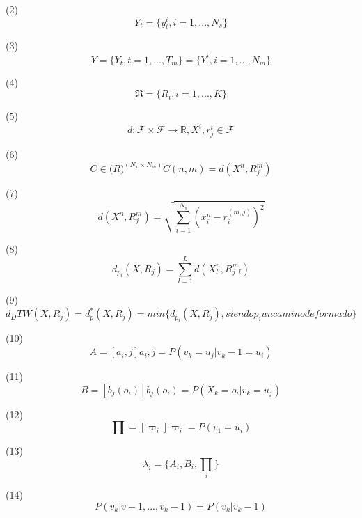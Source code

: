 (2)
\begin{equation}
  Y_t = \{y_t^i, i = 1, ..., N_s\}
\end{equation}

(3)
\begin{equation}
  Y = \{Y_t, t = 1, ..., T_m\} = \{Y^i, i = 1, ..., N_m\}
\end{equation}

(4)
\begin{equation}
  \Re = \{R_i, i = 1, ..., K\}
\end{equation}


(5)
\begin{equation}
  d: \mathcal{F} \times \mathcal{F} \rightarrow \mathbb{R},    X^i , r_j^i \in \mathcal{F}
\end{equation}

(6)
\begin{equation}
  C \in \mathbb(R)^(N_x \times N_m)  C(n,m) = d(X^n, R_j^m)
\end{equation}

(7)
\begin{equation}
  d(X^n, R_j^m) = \sqrt{\sum_{i=1}^{N_s}(x_i^n - r_i^(m,j))^2}
\end{equation}


(8)
\begin{equation}
  d_p_i(X, R_j) = \sum_{l=1}^{L}d(X^n_l, R_j^m_l)
\end{equation}


(9)
\begin{equation}
  d_DTW(X,R_j) = d_p^\ast(X, R_j) = min\{d_p_i (X,R_j), siendo p_i un camino deformado\}
\end{equation}

(10)
\begin{equation}
  A = [a_i,j] a_i,j = P(v_k = u_j | v_k-1 = u_i)
\end{equation}

(11)
\begin{equation}
  B = [b_j(o_i)]  b_j(o_i) = P(X_k = o_i | v_k = u_j )
\end{equation}

(12)
\begin{equation}
  \prod =  [\varpi_i] \varpi_i = P(v_1 = u_i)
\end{equation}

(13)
\begin{equation}
  \lambda_i = \{A_i, B_i, \prod_i\}
\end{equation}

(14)
\begin{equation}
  P(v_k | v-1, ..., v_k-1) = P(v_k | v_k-1)
\end{equation}

